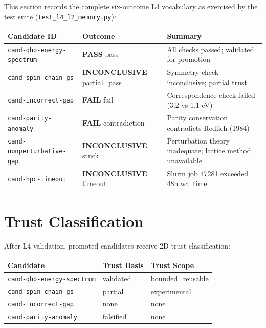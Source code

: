 \documentclass[11pt,a4paper]{article}
\newcommand{\statuspass}{\textcolor{passgreen}{\textbf{PASS}}}
\newcommand{\statusfail}{\textcolor{failred}{\textbf{FAIL}}}
\newcommand{\statuswarn}{\textcolor{warnorange}{\textbf{INCONCLUSIVE}}}
\begin{document}
This section records the complete six-outcome L4 vocabulary as exercised
by the test suite (\texttt{test\_l4\_l2\_memory.py}):

\begin{longtable}{>{\raggedright}p{3cm} p{2.5cm} p{7cm}}
\toprule
\textbf{Candidate ID} & \textbf{Outcome} & \textbf{Summary} \\
\midrule
\endhead
\texttt{cand-qho-energy-spectrum} & \statuspass{} pass & All checks passed; validated for promotion \\
\texttt{cand-spin-chain-gs} & \statuswarn{} partial\_pass & Symmetry check inconclusive; partial trust \\
\texttt{cand-incorrect-gap} & \statusfail{} fail & Correspondence check failed (3.2 vs 1.1 eV) \\
\texttt{cand-parity-anomaly} & \statusfail{} contradiction & Parity conservation contradicts Redlich (1984) \\
\texttt{cand-nonperturbative-gap} & \statuswarn{} stuck & Perturbation theory inadequate; lattice method unavailable \\
\texttt{cand-hpc-timeout} & \statuswarn{} timeout & Slurm job 47281 exceeded 48h walltime \\
\bottomrule
\end{longtable}


\section{Trust Classification}

After L4 validation, promoted candidates receive 2D trust classification:

\begin{tabular}{lll}
\toprule
\textbf{Candidate} & \textbf{Trust Basis} & \textbf{Trust Scope} \\
\midrule
\texttt{cand-qho-energy-spectrum} & validated & bounded\_reusable \\
\texttt{cand-spin-chain-gs}        & partial   & experimental \\
\texttt{cand-incorrect-gap}        & none      & none \\
\texttt{cand-parity-anomaly}       & falsified & none \\
\bottomrule
\end{tabular}
\end{document}
